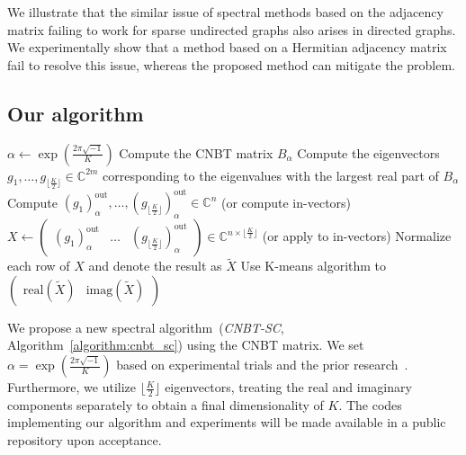 \documentclass{article}
\theoremstyle{plain}
\begin{document}
We illustrate that the similar issue of spectral methods based on the adjacency matrix failing to work for sparse undirected graphs also arises in directed graphs.
We experimentally show that a method based on a Hermitian adjacency matrix fail to resolve this issue,
whereas the proposed method can mitigate the problem.

\subsection{Our algorithm}

\begin{algorithm}[tb]
	\caption{CNBT-SC~(in/out)}
	\label{algorithm:cnbt_sc}
	\begin{algorithmic}[1]
		\State $\alpha \gets \exp\left( \frac{2\pi \sqrt{-1}}{K} \right)$
		\State Compute the CNBT matrix $B_{\alpha}$
		\State Compute the eigenvectors $g_1,\dots, g_{\lfloor \frac{K}{2} \rfloor} \in \mathbb{C}^{2m}$ corresponding to the eigenvalues with the largest real part of $B_{\alpha}$
		\State Compute $(g_1)_{\alpha}^{\text{out}}, \dots, (g_{\lfloor \frac{K}{2} \rfloor})_{\alpha}^{\text{out}} \in \mathbb{C}^{n}$ (or compute in-vectors)
		\State $X \gets \begin{pmatrix} (g_1)_{\alpha}^{\text{out}} & \dots & (g_{\lfloor \frac{K}{2} \rfloor})_{\alpha}^{\text{out}} \end{pmatrix} \in \mathbb{C}^{n \times \lfloor \frac{K}{2} \rfloor}$ (or apply to in-vectors)
		\State Normalize each row of $X$ and denote the result as $\tilde{X}$
		\State Use K-means algorithm to $\begin{pmatrix} \text{real}(\tilde{X}) & \text{imag}(\tilde{X}) \end{pmatrix}$
	\end{algorithmic}
\end{algorithm}

We propose a new spectral algorithm~(\textit{CNBT-SC}, Algorithm~\ref{algorithm:cnbt_sc}) using the CNBT matrix.
We set $\alpha=\exp\left( \frac{2\pi \sqrt{-1}}{K} \right)$ based on experimental trials and the prior research~\citep{Laenen2020-ft}.
Furthermore, we utilize $\lfloor \frac{K}{2} \rfloor$ eigenvectors, treating the real and imaginary components separately to obtain a final dimensionality of $K$.
The codes implementing our algorithm and experiments will be made available in a public repository upon acceptance.
\end{document}
